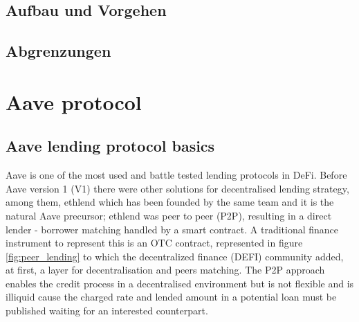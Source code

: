 \documentclass[11pt,a4paper,titlepage]{scrartcl}
\begin{document}
\subsection{Aufbau und Vorgehen}
\subsection{Abgrenzungen}

\newpage

\section{Aave protocol}
\subsection{Aave lending protocol basics}
Aave is one of the most used and battle tested lending protocols in DeFi. Before Aave version 1 (V1) there were other solutions for decentralised lending strategy, among them, ethlend which has been founded by the same team and it is the natural Aave precursor; ethlend was  peer to peer (P2P), resulting in a direct lender - borrower matching handled by a smart contract. A traditional finance instrument to represent this is an OTC contract, represented in figure \ref{fig:peer_lending} to which the decentralized finance (DEFI) community added, at first, a layer for decentralisation and peers matching. The P2P approach enables  the credit process in a decentralised environment but is not flexible and is illiquid cause the charged rate and lended amount in a potential loan must be published waiting for an interested counterpart. 
\end{document}
